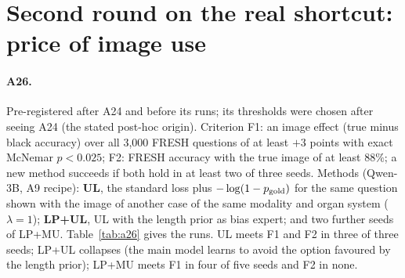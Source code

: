 
\section{Second round on the real shortcut: price of image use}
\label{app:a26}

\paragraph{A26.}
Pre-registered after A24 and before its runs; its thresholds were chosen after seeing A24 (the stated post-hoc origin).
Criterion F1: an image effect (true minus black accuracy) over all 3{,}000 FRESH questions of at least $+3$ points with exact McNemar $p<0.025$; F2: FRESH accuracy with the true image of at least $88\%$; a new method succeeds if both hold in at least two of three seeds.
Methods (Qwen-3B, A9 recipe): \textbf{UL}, the standard loss plus $-\log(1-p_{\rm gold})$ for the same question shown with the image of another case of the same modality and organ system ($\lambda=1$); \textbf{LP+UL}, UL with the length prior as bias expert; and two further seeds of LP+MU.
Table~\ref{tab:a26} gives the runs.
UL meets F1 and F2 in three of three seeds; LP+UL collapses (the main model learns to avoid the option favoured by the length prior); LP+MU meets F1 in four of five seeds and F2 in none.

